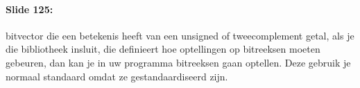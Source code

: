 \documentclass[10pt,a4paper]{book}
\begin{document}
\paragraph{Slide 125:} bitvector die een betekenis heeft van een unsigned of tweecomplement getal, als je die bibliotheek insluit, die definieert hoe optellingen op bitreeksen moeten gebeuren, dan kan je in uw programma bitreeksen gaan optellen. Deze gebruik je normaal standaard omdat ze gestandaardiseerd zijn.
\end{document}
